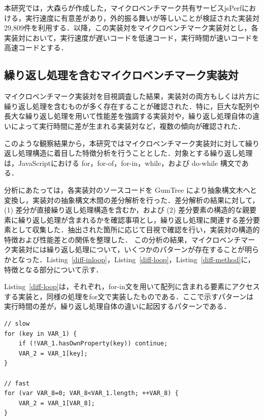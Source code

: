 \documentclass[submit,techrep,noauthor]{ipsj}
\newcommand{\todo}[1]{\colorbox{yellow}{{\bf TODO}:}{\color{red} {\textbf{[#1]}}}}
\begin{document}
本研究では，大森ら\cite{omori}が作成した，マイクロベンチマーク共有サービスjsPerfにおける，実行速度に有意差があり，外的振る舞いが等しいことが検証された実装対29,809件を利用する．以降，この実装対をマイクロベンチマーク実装対とし，各実装対において，実行速度が遅いコードを低速コード，実行時間が速いコードを高速コードとする．

\subsection{繰り返し処理を含むマイクロベンチマーク実装対}
\label{section3.1}


マイクロベンチマーク実装対を目視調査した結果，実装対の両方もしくは片方に繰り返し処理を含むものが多く存在することが確認された．特に，巨大な配列や長大な繰り返し処理を用いて性能差を強調する実装対や，繰り返し処理自体の違いによって実行時間に差が生まれる実装対など，複数の傾向が確認された．

このような観察結果から，本研究ではマイクロベンチマーク実装対に対して繰り返し処理構造に着目した特徴分析を行うこととした．対象とする繰り返し処理は，JavaScriptにおける for，for-of，for-in，while，および do-while 構文である．

分析にあたっては，各実装対のソースコードを GumTree \cite{gumtree}により抽象構文木へと変換し，実装対の抽象構文木間の差分解析を行った．差分解析の結果に対して，(1) 差分が直接繰り返し処理構造を含むか，および (2) 差分要素の構造的な親要素に繰り返し処理が含まれるかを確認事項とし，繰り返し処理に関連する差分要素として収集した．抽出された箇所に応じて目視で確認を行い，実装対の構造的特徴および性能差との関係を整理した．
この分析の結果，マイクロベンチマーク実装対には繰り返し処理について，いくつかのパターンが存在することが明らかとなった．Listing~\ref{diff-inloop}，Listing~\ref{diff-loop}，Listing~\ref{diff-method}に，特徴となる部分について示す．

Listing~\ref{diff-loop}は，それぞれ，for-in文を用いて配列に含まれる要素にアクセスする実装と，同様の処理をfor文で実装したものである．ここで示すパターンは実行時間の差が，繰り返し処理自体の違いに起因するパターンである．
\begin{lstlisting}[caption=Pairs with loop differences, label=diff-loop, captionpos=t, columns=flexible]
// slow
for (key in VAR_1) {
    if (!VAR_1.hasOwnProperty(key)) continue;
    VAR_2 = VAR_1[key];
}

// fast
for (var VAR_8=0; VAR_8<VAR_1.length; ++VAR_8) {
    VAR_2 = VAR_1[VAR_8];
}
\end{lstlisting}
\end{document}
